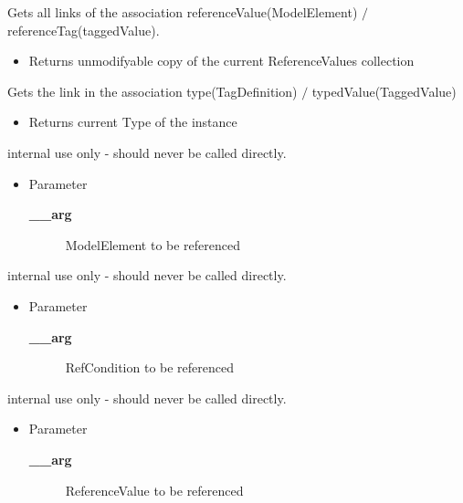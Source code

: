 \begin{desc}Gets all links of the association referenceValue(ModelElement)
 $/$ referenceTag(taggedValue).
\begin{itemize}
\item{Returns unmodifyable copy of the current ReferenceValues collection }
\end{itemize}
\end{desc}

\begin{desc}Gets the link in the association type(TagDefinition)
 $/$ typedValue(TaggedValue)
\begin{itemize}
\item{Returns current Type of the instance }
\end{itemize}
\end{desc}

\begin{desc}internal use only - should never be called directly.
\begin{itemize}
\item{Parameter
  \begin{description}
   \item[{\bf \_\_arg}]{ModelElement to be referenced}
  \end{description}}
\end{itemize}
\end{desc}

\begin{desc}internal use only - should never be called directly.
\begin{itemize}
\item{Parameter
  \begin{description}
   \item[{\bf \_\_arg}]{RefCondition to be referenced}
  \end{description}}
\end{itemize}
\end{desc}

\begin{desc}internal use only - should never be called directly.
\begin{itemize}
\item{Parameter
  \begin{description}
   \item[{\bf \_\_arg}]{ReferenceValue to be referenced}
  \end{description}}
\end{itemize}
\end{desc}


